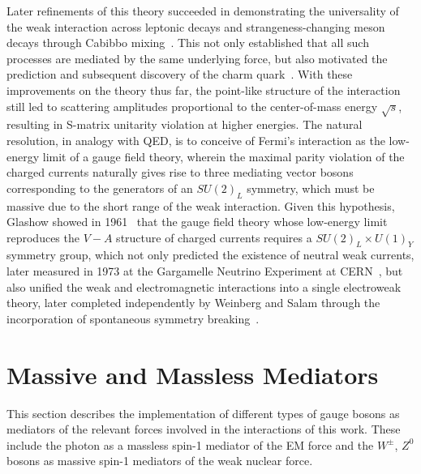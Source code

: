 Later refinements of this theory succeeded in demonstrating the universality of the weak interaction across leptonic decays and strangeness-changing meson decays through Cabibbo mixing~\cite{Cabibbo:1963yz}. This not only established that all such processes are mediated by the same underlying force, but also motivated the prediction and subsequent discovery of the charm quark~\cite{Glashow:1970gm}. With these improvements on the theory thus far, the point-like structure of the interaction still led to scattering amplitudes proportional to the center-of-mass energy $\sqrt{s}$, resulting in S-matrix unitarity violation at higher energies. The natural resolution, in analogy with QED, is to conceive of Fermi's interaction as the low-energy limit of a gauge field theory, wherein the maximal parity violation of the charged currents naturally gives rise to three mediating vector bosons corresponding to the generators of an $SU(2)_L$ symmetry, which must be massive due to the short range of the weak interaction. Given this hypothesis, Glashow showed in 1961~\cite{Glashow1961} that the gauge field theory whose low-energy limit reproduces the $V-A$ structure of charged currents requires a $SU(2)_L \times U(1)_Y$ symmetry group, which not only predicted the existence of neutral weak currents, later measured in 1973 at the Gargamelle Neutrino Experiment at CERN~\cite{Hasert1973a, Hasert1973b}, but also unified the weak and electromagnetic interactions into a single electroweak theory, later completed independently by Weinberg and Salam through the incorporation of spontaneous symmetry breaking~\cite{Weinberg1967, Salam1968}.
\section{Massive and Massless Mediators}
This section describes the implementation of different types of gauge bosons as mediators of the relevant forces involved in the interactions of this work. These include the photon as a massless spin-1 mediator of the EM force and the $W^\pm$, $Z^0$ bosons as massive spin-1 mediators of the weak nuclear force.
